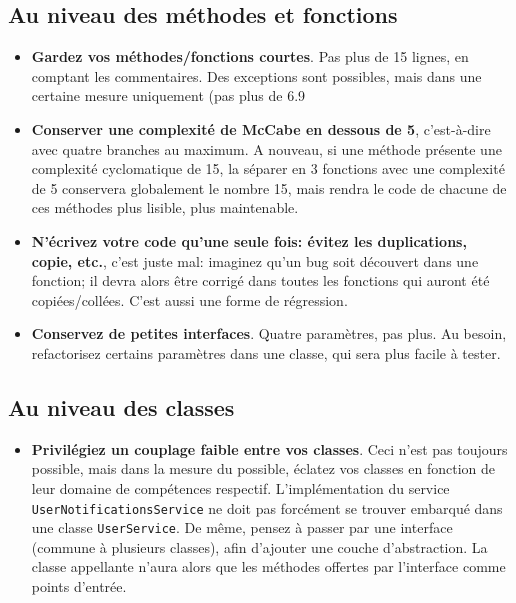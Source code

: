 \documentclass[11pt]{amsbook}
\begin{document}
\hypertarget{x-au-niveau-des-méthodes-et-fonctions}{\subsection{Au niveau des méthodes et fonctions}}
\begin{itemize}

\item \textbf{Gardez vos méthodes/fonctions courtes}. Pas plus de 15 lignes, en comptant les commentaires. Des exceptions sont possibles, mais dans une certaine mesure uniquement (pas plus de 6.9%

\item \textbf{Conserver une complexité de McCabe en dessous de 5}, c’est-à-dire avec quatre branches au maximum. A nouveau, si une méthode présente une complexité cyclomatique de 15, la séparer en 3 fonctions avec une complexité de 5 conservera globalement le nombre 15, mais rendra le code de chacune de ces méthodes plus lisible, plus maintenable.

\item \textbf{N’écrivez votre code qu’une seule fois: évitez les duplications, copie, etc.}, c’est juste mal: imaginez qu’un bug soit découvert dans une fonction; il devra alors être corrigé dans toutes les fonctions qui auront été copiées/collées. C’est aussi une forme de régression.

\item \textbf{Conservez de petites interfaces}. Quatre paramètres, pas plus. Au besoin, refactorisez certains paramètres dans une classe, qui sera plus facile à tester.

\end{itemize}


\hypertarget{x-au-niveau-des-classes}{\subsection{Au niveau des classes}}
\begin{itemize}

\item \textbf{Privilégiez un couplage faible entre vos classes}. Ceci n’est pas toujours possible, mais dans la mesure du possible, éclatez vos classes en fonction de leur domaine de compétences respectif. L’implémentation du service \texttt{UserNotificationsService} ne doit pas forcément se trouver embarqué dans une classe \texttt{UserService}. De même, pensez à passer par une interface (commune à plusieurs classes), afin d’ajouter une couche d’abstraction. La classe appellante n’aura alors que les méthodes offertes par l’interface comme points d’entrée.

\end{itemize}
\end{document}

